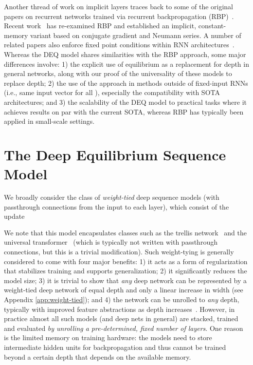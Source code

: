 \documentclass{article}
\begin{document}
Another thread of work on implicit layers traces back to some of the original papers on recurrent networks trained via recurrent backpropagation (RBP)~\citep{almeida1990learning,pineda1988generalization}.  Recent work~\citep{liao2018reviving} has re-examined RBP and established an implicit, constant-memory variant based on conjugate gradient and Neumann series. A number of related papers also enforce fixed point conditions within RNN architectures~\citep{zhang2019equilibrated,kazi2017implicitly}.  Whereas the DEQ model shares similarities with the RBP approach, some major differences involve: 1) the explicit use of equilibrium as a replacement for depth in general networks, along with our proof of the universality of these models to replace depth; 2) the use of the approach in methods outside of fixed-input RNNs (i.e., same input vector  for all ), especially the compatibility with SOTA architectures; and 3) the scalability of the DEQ model to practical tasks where it achieves results on par with the current SOTA, whereas RBP has typically been applied in small-scale settings.

\section{The Deep Equilibrium Sequence Model}
\label{sec:deq}

We broadly consider the class of \emph{weight-tied} deep sequence models (with passthrough connections from the input to each layer), which consist of the update

We note that this model encapsulates classes such as the trellis network~\citep{bai2018trellis} and the universal transformer~\citep{dehghani2018universal} (which is typically not written with passthrough connections, but this is a trivial modification).  Such weight-tying is generally considered to come with four major benefits: 1) it acts as a form of regularization that stabilizes training and supports generalization; 2) it significantly reduces the model size; 3) it is trivial to show that \emph{any} deep network can be represented by a weight-tied deep network of equal depth and only a linear increase in width (see Appendix \ref{app:weight-tied}); and 4) the network can be unrolled to \emph{any} depth, typically with improved feature abstractions as depth increases~\cite{bai2018trellis,dehghani2018universal}.
However, in practice almost all such models (and deep nets in general) are stacked, trained and evaluated \emph{by unrolling a pre-determined, fixed number of layers}. One reason is the limited memory on training hardware: the models need to store intermediate hidden units for backpropagation and thus cannot be trained beyond a certain depth that depends on the available memory.
\end{document}
